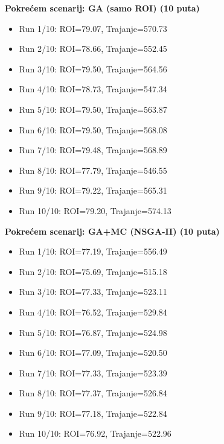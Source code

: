 \textbf{Pokrećem scenarij: GA (samo ROI) (10 puta)}
\begin{itemize}
    \item Run 1/10: ROI=79.07, Trajanje=570.73
    \item Run 2/10: ROI=78.66, Trajanje=552.45
    \item Run 3/10: ROI=79.50, Trajanje=564.56
    \item Run 4/10: ROI=78.73, Trajanje=547.34
    \item Run 5/10: ROI=79.50, Trajanje=563.87
    \item Run 6/10: ROI=79.50, Trajanje=568.08
    \item Run 7/10: ROI=79.48, Trajanje=568.89
    \item Run 8/10: ROI=77.79, Trajanje=546.55
    \item Run 9/10: ROI=79.22, Trajanje=565.31
    \item Run 10/10: ROI=79.20, Trajanje=574.13
\end{itemize}

\textbf{Pokrećem scenarij: GA+MC (NSGA-II) (10 puta)}
\begin{itemize}
    \item Run 1/10: ROI=77.19, Trajanje=556.49
    \item Run 2/10: ROI=75.69, Trajanje=515.18
    \item Run 3/10: ROI=77.33, Trajanje=523.11
    \item Run 4/10: ROI=76.52, Trajanje=529.84
    \item Run 5/10: ROI=76.87, Trajanje=524.98
    \item Run 6/10: ROI=77.09, Trajanje=520.50
    \item Run 7/10: ROI=77.33, Trajanje=523.39
    \item Run 8/10: ROI=77.37, Trajanje=526.84
    \item Run 9/10: ROI=77.18, Trajanje=522.84
    \item Run 10/10: ROI=76.92, Trajanje=522.96
\end{itemize}

